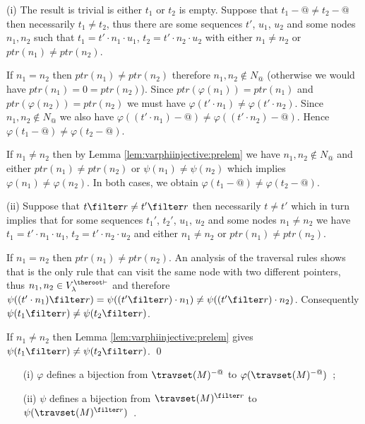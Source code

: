
(i) The result is trivial is either $t_1$ or $t_2$ is empty.
Suppose that $t_1-@\neq t_2-@$ then necessarily $t_1 \neq t_2$, thus there are some sequences $t'$, $u_1$, $u_2$ and some nodes $n_1,n_2$ such that
 $t_1 = t' \cdot n_1 \cdot u_1$, $t_2 = t' \cdot n_2 \cdot u_2$ with either $n_1\neq n_2$ or $ptr(n_1) \neq ptr(n_2)$.

If $n_1 = n_2$ then $ptr(n_1) \neq ptr(n_2)$ therefore $n_1,n_2 \not\in N_@$ (otherwise we would have $ptr(n_1) = 0 = ptr(n_2)$). Since $ptr(\varphi(n_1)) = ptr(n_1)$ and  $ptr(\varphi(n_2)) = ptr(n_2)$ we must have $\varphi(t' \cdot n_1) \neq \varphi(t' \cdot n_2)$. Since $n_1,n_2 \not\in N_@$ we also have $\varphi((t' \cdot n_1)-@) \neq \varphi((t' \cdot n_2)-@)$. Hence $\varphi(t_1-@) \neq \varphi(t_2-@)$.

If $n_1 \neq n_2$ then by Lemma \ref{lem:varphiinjective:prelem} we have $n_1,n_2 \not\in N_@$ and
either $ptr(n_1) \neq ptr(n_2)$ or $\psi(n_1) \neq \psi(n_2)$ which implies $\varphi(n_1) \neq \varphi(n_2)$.
In both cases, we obtain $\varphi(t_1-@) \neq \varphi(t_2-@)$.


(ii) Suppose that $t \filter r \neq t' \filter r$ then necessarily $t \neq t'$ which in turn implies that for some sequences $t_1'$, $t_2'$, $u_1$, $u_2$ and some nodes $n_1 \neq n_2$
we have $t_1 = t' \cdot n_1 \cdot u_1$, $t_2 = t' \cdot n_2 \cdot u_2$ and either $n_1\neq n_2$ or $ptr(n_1) \neq ptr(n_2)$.

If $n_1 = n_2$ then $ptr(n_1) \neq ptr(n_2)$. An analysis of the traversal rules shows that  is the only rule that can visit the same node with two different pointers, thus $n_1,n_2 \in V_\lambda^{\theroot\vdash}$
and therefore $\psi( (t'\cdot n_1) \filter r ) = \psi( (t'\filter r) \cdot n_1 )  \neq \psi( (t'\filter r) \cdot n_2 )$. Consequently $\psi( t_1\filter r ) \neq \psi( t_2\filter r )$.

If $n_1 \neq n_2$ then Lemma \ref{lem:varphiinjective:prelem}
gives $\psi( t_1\filter r ) \neq \psi( t_2\filter r )$. \qed



\begin{corollary} \hfill
\label{cor:varphi_bij}
\begin{itemize}
\item[(i)] $\varphi$ defines a bijection from $\travset(M)^{-@}$
to $\varphi(\travset(M)^{-@})$\ ;
\item[(ii)] $\psi$ defines a bijection from $\travset(M)^{\filter r}$ to
$\psi(\travset(M)^{\filter r})$\ .
\end{itemize}
\end{corollary}

